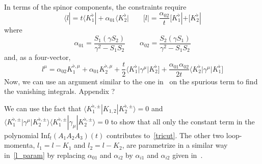 In terms of the spinor components, the constraints require
\begin{equation}\label{l_param}
\langle l | = t\langle K_1^\flat| + \alpha_{01}\langle K_2^\flat| \quad\quad
[ l | = \frac{\alpha_{02}}{t}[ K_1^\flat| + [ K_2^\flat|
\end{equation}
where
\begin{equation*}
\alpha_{01} = \frac{S_1(\gamma S_2)}{\gamma^2 - S_1S_2}\quad \quad
\alpha_{02} = \frac{S_2(\gamma S_1)}{\gamma^2 - S_1S_2}
\end{equation*}
%
and, as a four-vector,
\begin{equation*}
l^\mu = \alpha_{02} K_1^{\flat,\mu} + \alpha_{01}K_2^{\flat,\mu} + \frac{t}{2}\langle K_1^\flat | \gamma^\mu |K_2^\flat] + \frac{\alpha_{01}\alpha_{02}}{2t}\langle K_2^\flat|\gamma^\mu |K_1^\flat]
\end{equation*}
%
Now, we can use an argument similar to the one in~\cite{Ossola:2006us} on the spurious term to find the vanishing integrals.
\color{red}Appendix ?\color{black}
%
\iffalse
To illustrate this argument, we consider the case of a rank-1 3-point-like integral. 
By simple arguments on the rank and the dependence on external momenta, 
\begin{equation*}
\int\dd^D q \frac{q^\mu}{D_0(q)D_1(q+p_1)D_2(q+p_2)} = c_1p_1^\mu + c_2p_2^\mu
\end{equation*}
If we contract the above relation with a vector $v^\mu$ orthogonal to $p_1$ and $p_2$, we obtain a vanishing integral.
$q\cdot v$ is hence a spurious term.
The same technique can be applied to show that $(q\cdot v)^n$ is spurious for any $n>0$. 
\fi
%
We can use the fact that $\langle K_1^{\flat,\pm} | K_{1,2}|K_2^{\flat,\pm}\rangle = 0 $ and $\langle K_1^{\flat,\pm}|\gamma^\mu|K_{2}^{\flat,\pm}\rangle\langle K_1^{\flat,\pm}|\gamma_\mu|K_{2}^{\flat,\pm}\rangle = 0$
to show that all only the constant term in the polynomial $\mathrm{Inf}_t(A_1A_2A_3)(t)$ contributes to~\cref{tricut}. 
The other two loop-momenta, $l_1 = l-K_1$ and $l_2 = l-K_2$, are parametrize in a similar way in~\cref{l_param} by replacing $\alpha_{01}$ and $\alpha_{i2}$ by $\alpha_{i1}$ and $\alpha_{i2}$ given in~\cite{Forde:2007mi}.
%
%
